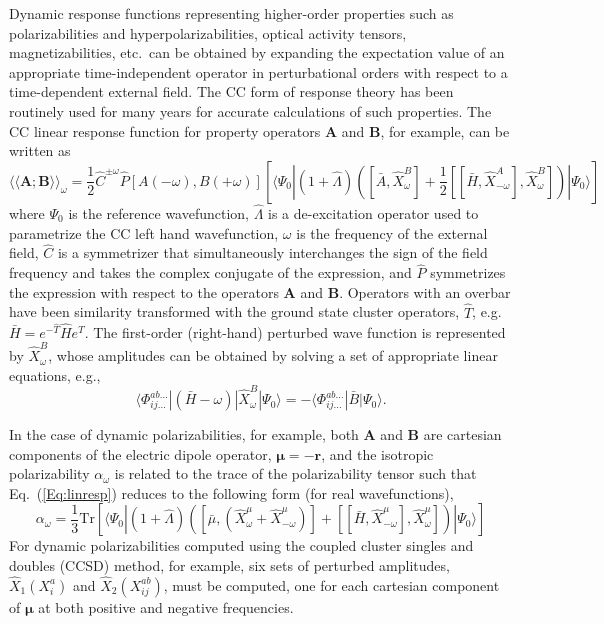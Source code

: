 Dynamic response functions representing higher-order properties such as
polarizabilities and hyperpolarizabilities, optical activity tensors,
magnetizabilities, etc.\ can be obtained by expanding the expectation value of
an appropriate time-independent operator in perturbational orders with respect
to a time-dependent external field.  The CC form of response
theory has been routinely used for many years for accurate calculations of
such properties.\cite{Helgaker12} The CC linear response function for
property operators $\bm{A}$ and $\bm{B}$, for example, can be written
as
\begin{equation}
{\langle\langle\bm{A};\bm{B}\rangle\rangle}_\omega=
\frac{1}{2}\hat{C}^{\pm\omega}\hat{P}[A(-\omega),B(+\omega)] \left[
\langle\Psi_0|(1+\hat{\Lambda})\left( [\bar{A},\hat{X}^B_{\omega}] +
\frac{1}{2}[[\bar{H},\hat{X}^{A}_{-\omega}], \hat{X}^{B}_{\omega}]
\right) |\Psi_0\rangle \right]
\label{Eq:linresp}
\end{equation}
where $\Psi_0$ is the reference wavefunction, $\hat{\Lambda}$ is a
de-excitation operator used to parametrize the CC left hand wavefunction,
$\omega$ is the frequency of the external field, $\hat{C}$ is a symmetrizer
that simultaneously interchanges the sign of the field frequency and takes the
complex conjugate of the expression, and $\hat{P}$ symmetrizes the expression
with respect to the operators $\bm{A}$ and $\bm{B}$. Operators with an
overbar have been similarity transformed with the ground state cluster
operators, $\hat{T}$, e.g. $\bar{H} = e^{-\hat{T}}\hat{H}e^{\hat{T}}$. The
first-order (right-hand) perturbed wave function is represented by
${\hat{X}^{B}_{\omega}}$, whose amplitudes can be obtained by solving a set
of appropriate linear equations, e.g.,
\begin{equation}
\langle\Phi_{ij\ldots}^{ab\ldots}|(\bar{H}-\omega)|\hat{X}^{B}_{\omega}|\Psi_0\rangle
= -\langle\Phi_{ij\ldots}^{ab\ldots}|\bar{B}|\Psi_0\rangle.
\label{Eq:perturbed_wfn}
\end{equation} 

In the case of dynamic polarizabilities, for example, both $\bm{A}$ and
$\bm{B}$ are cartesian components of the electric dipole operator, $\bm{\mu}
= -\bm{r}$, and the isotropic polarizability $\alpha_{\omega}$ is
related to the trace of the polarizability tensor such that Eq.\
(\ref{Eq:linresp}) reduces to the following form (for real
wavefunctions),
\begin{equation}
\alpha_{\omega} = \frac{1}{3} \mathrm{Tr}\left[
\langle\Psi_0|(1+\hat{\Lambda})\left(
\left[\bar{\mu},(\hat{X}^{{\mu}}_{\omega} +
\hat{X}^{{\mu}}_{-\omega})\right] +
\left[\left[\bar{H},\hat{X}^{{\mu}}_{-\omega}\right],
\hat{X}^{{\mu}}_{\omega}\right]\right) | \Psi_0\rangle\right]
\label{Eq:alpha}
\end{equation}
For dynamic polarizabilities computed using the coupled cluster singles and
doubles (CCSD) method, for example, six sets of perturbed amplitudes,
$\hat{X}_1 (X^{a}_{i})$ and $\hat{X}_2 (X^{ab}_{ij})$, must be computed, one for each cartesian
component of $\bm{\mu}$ at both positive and negative frequencies.


